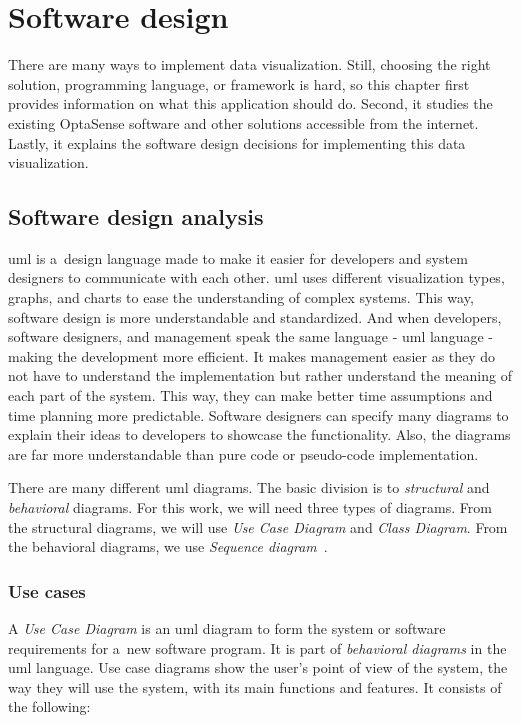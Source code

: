 
\chapter{Software design}\label{txt.design.design}

There are many ways to implement data visualization. Still, choosing the right solution, programming language, or framework is hard, so this chapter first provides information on what this application should do. Second, it studies the existing OptaSense software and other solutions accessible from the internet. Lastly, it explains the software design decisions for implementing this data visualization.

\section{Software design analysis}\label{txt.design.sw}

\ac{uml} is a~design language made to make it easier for developers and system designers to communicate with each other. \ac{uml} uses different visualization types, graphs, and charts to ease the understanding of complex systems. This way, software design is more understandable and standardized. And when developers, software designers, and management speak the same language - \ac{uml} language - making the development more efficient. It makes management easier as they do not have to understand the implementation but rather understand the meaning of each part of the system. This way, they can make better time assumptions and time planning more predictable. Software designers can specify many diagrams to explain their ideas to developers to showcase the functionality. Also, the diagrams are far more understandable than pure code or pseudo-code implementation. 

There are many different \ac{uml} diagrams. The basic division is to \textit{structural} and \textit{behavioral} diagrams. For this work, we will need three types of diagrams. From the structural diagrams, we will use \textit{Use Case Diagram} and \textit{Class Diagram}. From the behavioral diagrams, we use \textit{Sequence diagram}~\cite{usecase}.

\subsection{Use cases}\label{txt.design.sw.usecase}

A \textit{Use Case Diagram} is an \ac{uml} diagram to form the system or software requirements for a~new software program. It is part of \textit{behavioral diagrams} in the \ac{uml} language. Use case diagrams show the user's point of view of the system, the way they will use the system, with its main functions and features. It consists of the following:

